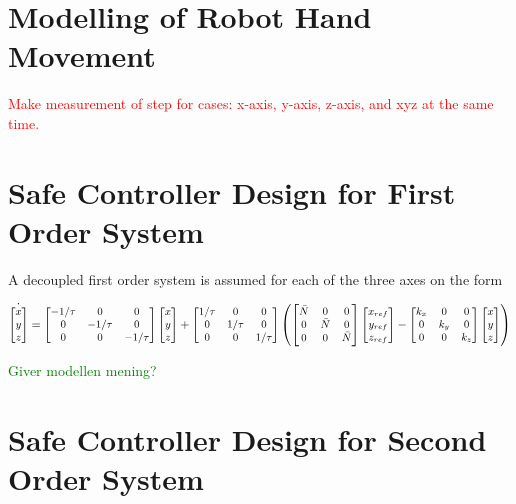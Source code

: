 \section{Modelling of Robot Hand Movement}
\textcolor{red}{Make measurement of step for cases: x-axis, y-axis, z-axis, and xyz at the same time.}

\section{Safe Controller Design for First Order System}

A decoupled first order system is assumed for each of the three axes on the form

\begin{equation}
\small
\dot{\begin{bmatrix}
	x\\y\\z
	\end{bmatrix}} =
\begin{bmatrix}
-1/\tau & 0 & 0\\0 & -1/\tau & 0 \\ 0 & 0 & -1/\tau
\end{bmatrix}
\begin{bmatrix}
x\\y\\z
\end{bmatrix} +
\begin{bmatrix}
1/\tau& 0 & 0 \\ 0& 1/\tau & 0 \\0& 0& 1/\tau
\end{bmatrix} 
\left(
\begin{bmatrix}
\bar{N} & 0 & 0 \\0 & \bar{N} & 0 \\0& 0& \bar{N}
\end{bmatrix}
\begin{bmatrix}
x_{ref}\\y_{ref}\\z_{ref}
\end{bmatrix}
-
\begin{bmatrix}
k_x & 0 & 0 \\0 & k_y & 0 \\0& 0&  k_z
\end{bmatrix}
\begin{bmatrix}
x\\y\\z
\end{bmatrix}
\right)
\end{equation}

\textcolor{green}{Giver modellen mening?}

\section{Safe Controller Design for Second Order System}